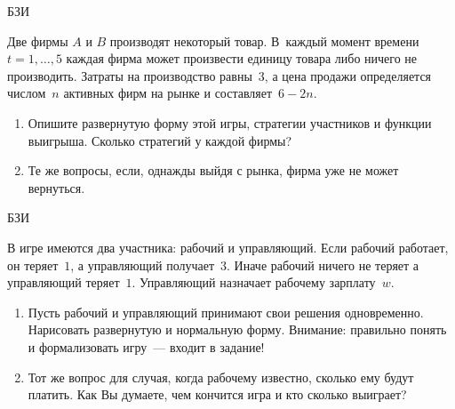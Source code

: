 \begin{problem}
\begin{source}
БЗИ
\end{source}
 Две фирмы $A$ и $B$ производят
некоторый товар. В~каждый момент времени $t=1,\ldots,5$
каждая фирма может произвести единицу товара либо ничего не
производить. Затраты на производство равны~$3$, а цена
продажи определяется числом~$n$ активных фирм на рынке и
составляет~$6-2n$.

\begin{enumerate}

\item Опишите развернутую форму этой игры, стратегии
участников и функции выигрыша. Сколько стратегий у каждой
фирмы?

\item Те же вопросы, если, однажды выйдя с рынка, фирма уже
не может вернуться.

\end{enumerate}






\begin{sol}

\end{sol}
\end{problem}



\begin{problem}
\begin{source}
БЗИ
\end{source}
 В игре имеются два
участника: рабочий и управляющий. Если рабочий работает, он
теряет~$1$, а управляющий получает~$3$. Иначе рабочий
ничего не теряет а управляющий теряет~$1$. Управляющий
назначает рабочему зарплату~$w$.

\begin{enumerate}

\item Пусть рабочий и управляющий принимают свои решения
одновременно. Нарисовать развернутую и нормальную форму.
Внимание: правильно понять и формализовать игру~--- входит
в задание!


\item Тот же вопрос для случая, когда рабочему известно,
сколько ему будут платить. Как Вы думаете, чем кончится
игра и кто сколько выиграет?

\end{enumerate}






\begin{sol}

\end{sol}
\end{problem}






